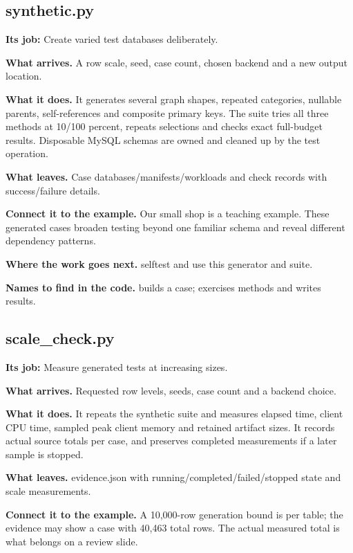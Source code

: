 
\subsection{synthetic.py}

\textbf{Its job:} Create varied test databases deliberately.

\textbf{What arrives.} A row scale, seed, case count, chosen backend and a new output location.

\textbf{What it does.} It generates several graph shapes, repeated categories, nullable parents, self-references and composite primary keys. The suite tries all three methods at 10/100 percent, repeats selections and checks exact full-budget results. Disposable MySQL schemas are owned and cleaned up by the test operation.

\textbf{What leaves.} Case databases/manifests/workloads and check records with success/failure details.

\textbf{Connect it to the example.} Our small shop is a teaching example. These generated cases broaden testing beyond one familiar schema and reveal different dependency patterns.

\textbf{Where the work goes next.} selftest and  use this generator and suite.

\textbf{Names to find in the code.}  builds a case;  exercises methods and writes results.


\subsection{scale\_check.py}

\textbf{Its job:} Measure generated tests at increasing sizes.

\textbf{What arrives.} Requested row levels, seeds, case count and a backend choice.

\textbf{What it does.} It repeats the synthetic suite and measures elapsed time, client CPU time, sampled peak client memory and retained artifact sizes. It records actual source totals per case, and preserves completed measurements if a later sample is stopped.

\textbf{What leaves.} evidence.json with running/completed/failed/stopped state and scale measurements.

\textbf{Connect it to the example.} A 10,000-row generation bound is per table; the evidence may show a case with 40,463 total rows. The actual measured total is what belongs on a review slide.


